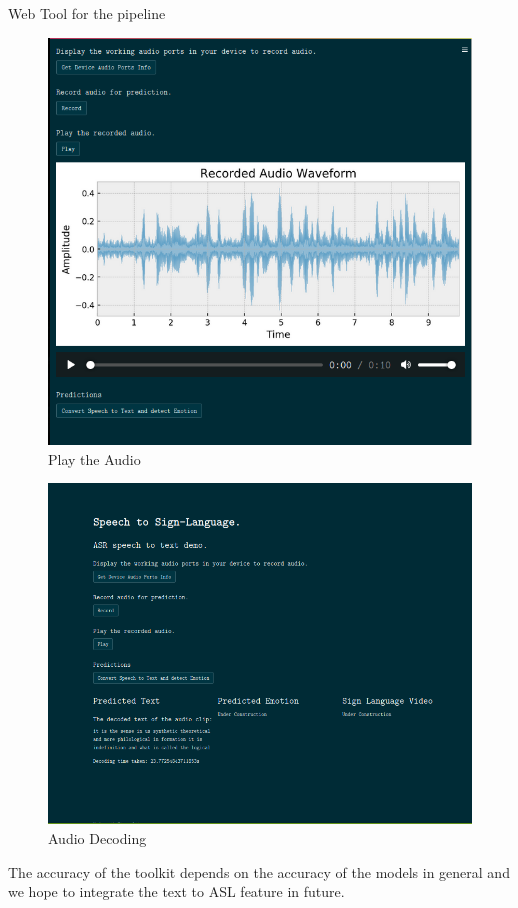 \documentclass[10pt]{beamer}
\begin{document}
\begin{frame}{Web Tool for the pipeline}
\begin{minipage}{0.3\textwidth}
\begin{figure}
	\includegraphics[width=\textwidth]{images/streamlit_app2.png}
	\caption{Play the Audio}
\end{figure}
\end{minipage}
\begin{minipage}{0.35\textwidth}
\centering
\begin{figure}
	\includegraphics[width=\textwidth]{images/streamlit_app3.png}
	\caption{Audio Decoding}
\end{figure}
\end{minipage}

The accuracy of the toolkit depends on the accuracy of the models in general and we hope to integrate the text to ASL feature in future.
\end{frame}
\end{document}
